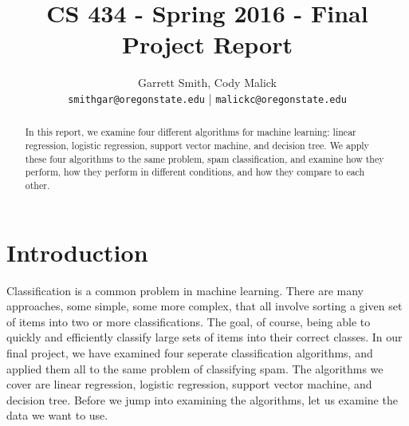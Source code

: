 \documentclass[10pt,letterpaper,onecolumn,draftclsnofoot]{IEEEtran}
\begin{document}
\begin{titlepage}
  \title{CS 434 - Spring 2016 - Final Project Report}
  \author{Garrett Smith, Cody Malick\\
  \texttt{smithgar@oregonstate.edu} | \texttt{malickc@oregonstate.edu}}
  \maketitle
  \vspace*{4cm}
  \begin{abstract}
      \noindent In this report, we examine four different algorithms for machine
      learning: linear regression, logistic regression, support vector machine,
      and decision tree. We apply these four algorithms to the same problem, spam
      classification, and examine how they perform, how they perform in different
      conditions, and how they compare to each other.

  \end{abstract}
\end{titlepage}

\tableofcontents
\clearpage
\section{Introduction}
Classification is a common problem in machine learning. There are many approaches,
some simple, some more complex, that all involve sorting a given set of items into
two or more classifications. The goal, of course, being able to quickly and efficiently
classify large sets of items into their correct classes. In our final project, we
have examined four seperate classification algorithms, and applied them all to the
same problem of classifying spam. The algorithms we cover are linear regression,
logistic regression, support vector machine, and decision tree. Before we jump
into examining the algorithms, let us examine the data we want to use.
\end{document}
